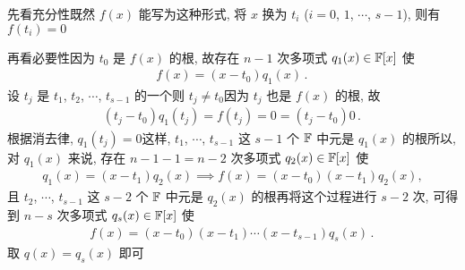 \begin{pf}
    先看充分性\period 既然 $f(x)$ 能写为这种形式, 将 $x$ 换为 $t_i$ ($i = 0$, $1$, $\cdots$, $s-1$), 则有 $f(t_i) = 0$\period

    再看必要性\period 因为 $t_0$ 是 $f(x)$ 的根, 故存在 $n-1$ 次多项式 $q_1 (x) \in \mathbb{F}[x]$ 使
    \begin{align*}
        f(x) = (x - t_0) q_1 (x) \period
    \end{align*}
    设 $t_j$ 是 $t_1$, $t_2$, $\cdots$, $t_{s-1}$ 的一个\period 则 $t_j \neq t_0$\period 因为 $t_j$ 也是 $f(x)$ 的根, 故
    \begin{align*}
        (t_j - t_0) q_1 (t_j) = f(t_j) = 0 = (t_j - t_0) 0 \period
    \end{align*}
    根据消去律, $q_1 (t_j) = 0$\period 这样, $t_1$, $\cdots$, $t_{s-1}$ 这 $s-1$ 个 $\mathbb{F}$ 中元是 $q_1 (x)$ 的根\period 所以, 对 $q_1 (x)$ 来说, 存在 $n-1-1 = n-2$ 次多项式 $q_2 (x) \in \mathbb{F}[x]$ 使
    \begin{align*}
        q_1 (x) = (x - t_1) q_2 (x) \implies f(x) = (x - t_0) (x - t_1) q_2 (x),
    \end{align*}
    且 $t_2$, $\cdots$, $t_{s-1}$ 这 $s-2$ 个 $\mathbb{F}$ 中元是 $q_2 (x)$ 的根\period 再将这个过程进行 $s-2$ 次, 可得到 $n-s$ 次多项式 $q_s (x) \in \mathbb{F}[x]$ 使
    \begin{align*}
        f(x) = (x - t_0) (x - t_1) \cdots (x - t_{s-1}) q_s (x) \period
    \end{align*}
    取 $q(x) = q_s (x)$ 即可\period
\end{pf}

